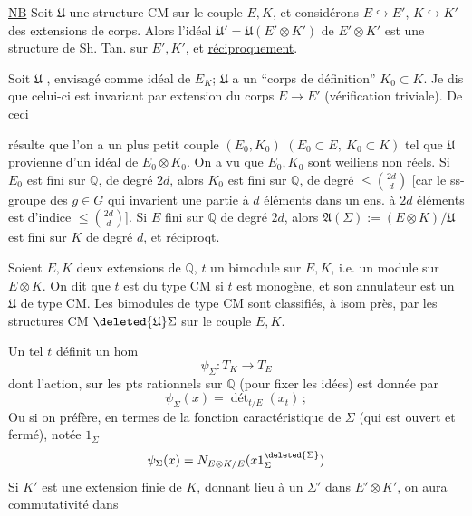 \uline{NB} Soit $\mathfrak U$ une structure CM sur le couple $E,K$,
et considérons $E\hookrightarrow E'$, $K\hookrightarrow K'$ des extensions de corps.
Alors l'idéal $\mathfrak U'=\mathfrak U(E'\otimes K')$ de $E'\otimes K'$ est une structure
 de Sh. Tan. sur $E',K'$, et \uline{réciproquement}.

 Soit $\mathfrak U$
 , envisagé
comme idéal de $E_K$; $\mathfrak U$ a un ``corps de définition'' $K_0\subset K$.
Je dis que celui-ci est invariant par extension du corps $E\longrightarrow E'$
(vérification triviale). De ceci

résulte que l'on a un plus petit couple $(E_0,K_0)$ $(E_0\subset E,\ K_0\subset K)$
tel que $\mathfrak U$ provienne d'un idéal de $E_0\otimes K_0$.
On a vu que $E_0,K_0$ sont weiliens non réels. Si $E_0$ est fini sur $\mathbb Q$,
de degré $2d$, alors $K_0$ est fini sur $\mathbb Q$, de degré $\leq\binom{2d}{d}$
[car le ss-groupe des $g\in G$ qui invarient une partie à $d$ éléments
dans un ens. à $2d$ éléments est d'indice $\leq\binom{2d}{d}$].
 Si $E$ fini sur $\mathbb Q$ de degré $2d$, alors
$\mathfrak A(\Sigma):=(E\otimes K)/\mathfrak U$ est fini sur $K$ de degré $d$,
et réciproqt.

Soient $E,K$ deux extensions de $\mathbb Q$, $t$ un bimodule sur $E,K$, i.e. un module
sur $E\otimes K$. On dit que $t$ est du type CM si $t$ est monogène, et son annulateur
est un $\mathfrak U$ de type CM. Les bimodules de type CM  sont
classifiés, à isom près, par les structures CM $\deleted{\mathfrak U}\Sigma$ sur le couple $E,K$.

Un tel $t$ définit 
un hom
\[
\psi_\Sigma:T_K\longrightarrow T_E
\]
dont l'action, sur les pts rationnels sur $\mathbb Q$ (pour fixer les idées) est donnée par
\[
\psi_\Sigma(x)=\operatorname{dét}_{t/E}(x_t)\,;
\]
Ou si on préfère, en termes de la fonction caractéristique de $\Sigma$
(qui est ouvert et fermé), notée  $1_\Sigma$
\[
\psi_\Sigma(x)=N_{E\otimes K/E}(x1_\Sigma^{\deleted{\Sigma}})
\]
Si $K'$ est une extension finie de $K$, 
donnant lieu à un $\Sigma'$ dans $E'\otimes K'$, on aura commutativité dans

